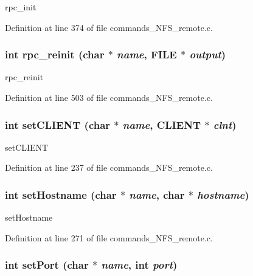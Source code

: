 rpc\_\-init 

Definition at line 374 of file commands\_\-NFS\_\-remote.c.
\subsubsection[{rpc\_\-reinit}]{\setlength{\rightskip}{0pt plus 5cm}int rpc\_\-reinit (char $\ast$ {\em name}, \/  FILE $\ast$ {\em output})}\label{commands__NFS__remote_8c_1f7267c9861733c60944246875185900}


rpc\_\-reinit 

Definition at line 503 of file commands\_\-NFS\_\-remote.c.
\subsubsection[{setCLIENT}]{\setlength{\rightskip}{0pt plus 5cm}int setCLIENT (char $\ast$ {\em name}, \/  CLIENT $\ast$ {\em clnt})}\label{commands__NFS__remote_8c_2a3805bb7043e832dde9e8f150dd6178}


setCLIENT 

Definition at line 237 of file commands\_\-NFS\_\-remote.c.
\subsubsection[{setHostname}]{\setlength{\rightskip}{0pt plus 5cm}int setHostname (char $\ast$ {\em name}, \/  char $\ast$ {\em hostname})}\label{commands__NFS__remote_8c_c87ac8af2ccef1d7270f5cfe5cba4c5c}


setHostname 

Definition at line 271 of file commands\_\-NFS\_\-remote.c.
\subsubsection[{setPort}]{\setlength{\rightskip}{0pt plus 5cm}int setPort (char $\ast$ {\em name}, \/  int {\em port})}\label{commands__NFS__remote_8c_817b2d1e48b69e9c8ee3cdbb2597b170}


